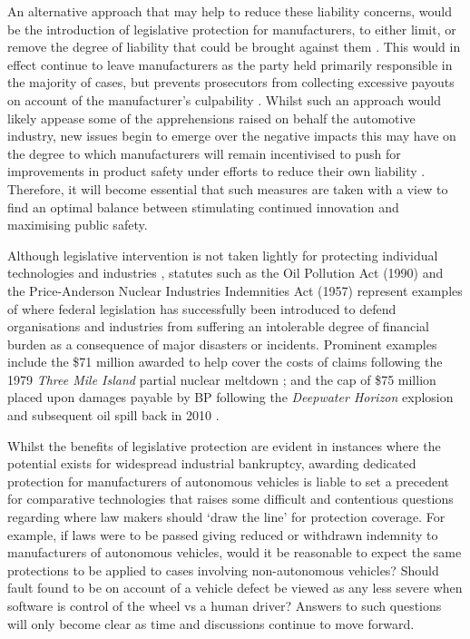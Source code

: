 \documentclass[conference]{IEEEtran}
\begin{document}
An alternative approach that may help to reduce these liability concerns, would be the introduction of legislative protection for manufacturers, to either limit, or remove the degree of liability that could be brought against them \cite{marchant}. This would in effect continue to leave manufacturers as the party held primarily responsible in the majority of cases, but prevents prosecutors from collecting excessive  payouts on account of the manufacturer's culpability \cite{marchant}. Whilst such an approach would likely appease some of the apprehensions raised on behalf the automotive industry, new issues begin to emerge over the negative impacts this may have on the degree to which manufacturers will remain incentivised to push for improvements in product safety under efforts to reduce their own liability \cite{marchant}. Therefore, it will become essential that such measures are taken with a view to find an optimal balance between stimulating continued innovation and maximising public safety. 
	
	Although legislative intervention is not taken lightly for protecting individual technologies and industries \cite{marchant}, statutes such as the Oil Pollution Act (1990) \cite{oil-pollution} and the Price-Anderson Nuclear Industries Indemnities Act (1957) \cite{nuclear-act} represent examples of where federal legislation has successfully been introduced to defend organisations and industries from suffering an intolerable degree of financial burden as a consequence of major disasters or incidents. Prominent examples include the \$71 million awarded to help cover the costs of claims following the 1979 \textit{Three Mile Island} partial nuclear meltdown \cite{nuclear-act}; and the cap of \$75 million placed upon damages payable by BP following the \textit{Deepwater Horizon} explosion and subsequent oil spill back in 2010 \cite{deepwater}.
	
	Whilst the benefits of legislative protection are evident in instances where the potential exists for widespread industrial bankruptcy, awarding dedicated  protection for manufacturers of autonomous vehicles is liable to set a precedent for comparative technologies that raises some difficult and contentious questions regarding where law makers should `draw the line' for protection coverage. For example, if laws were to be passed giving reduced or withdrawn indemnity to manufacturers of autonomous vehicles, would it be reasonable to expect the same protections to be applied to cases involving non-autonomous vehicles? Should fault found to be on account of a vehicle defect be viewed as any less severe when software is control of the wheel vs a human driver? Answers to such questions will only become clear as time and discussions continue to move forward.
\end{document}

